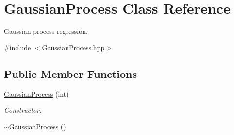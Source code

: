 \hypertarget{class_gaussian_process}{}\section{Gaussian\+Process Class Reference}
\label{class_gaussian_process}


Gaussian process regression.  




{\ttfamily \#include $<$Gaussian\+Process.\+hpp$>$}

\subsection*{Public Member Functions}
\begin{DoxyCompactItemize}
\item 
\hyperlink{class_gaussian_process_a6210360c7fa136e62c65049fb9eba1b0}{Gaussian\+Process} (int)
\begin{DoxyCompactList}\small\item\em Constructor. \end{DoxyCompactList}\item 
\hyperlink{class_gaussian_process_ad4a37cf074ca66f4639e0a0572f7583d}{$\sim$\+Gaussian\+Process} ()\hypertarget{class_gaussian_process_ad4a37cf074ca66f4639e0a0572f7583d}{}\label{class_gaussian_process_ad4a37cf074ca66f4639e0a0572f7583d}


\end{DoxyCompactItemize}
